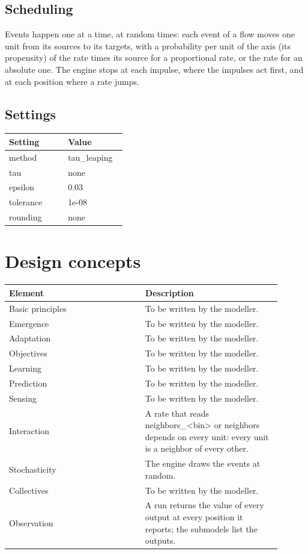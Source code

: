 \documentclass{article}
\begin{document}
\subsection*{Scheduling}
Events happen one at a time, at random times: each event of a flow moves one unit from its sources to its targets, with a probability per unit of the axis (its propensity) of the rate times its source for a proportional rate, or the rate for an absolute one. The engine stops at each impulse, where the impulses act first, and at each position where a rate jumps.

\subsection*{Settings}
\begin{longtable}{p{0.45\linewidth}p{0.45\linewidth}}
Setting & Value \\
\hline
\endhead
method & tau\_leaping \\
tau & none \\
epsilon & 0.03 \\
tolerance & 1e-08 \\
rounding & none \\
\end{longtable}
\section*{Design concepts}
\begin{longtable}{p{0.45\linewidth}p{0.45\linewidth}}
Element & Description \\
\hline
\endhead
Basic principles & To be written by the modeller. \\
Emergence & To be written by the modeller. \\
Adaptation & To be written by the modeller. \\
Objectives & To be written by the modeller. \\
Learning & To be written by the modeller. \\
Prediction & To be written by the modeller. \\
Sensing & To be written by the modeller. \\
Interaction & A rate that reads neighbors\_\textless{}bin\textgreater{} or neighbors depends on every unit: every unit is a neighbor of every other. \\
Stochasticity & The engine draws the events at random. \\
Collectives & To be written by the modeller. \\
Observation & A run returns the value of every output at every position it reports; the submodels list the outputs. \\
\end{longtable}
\end{document}
